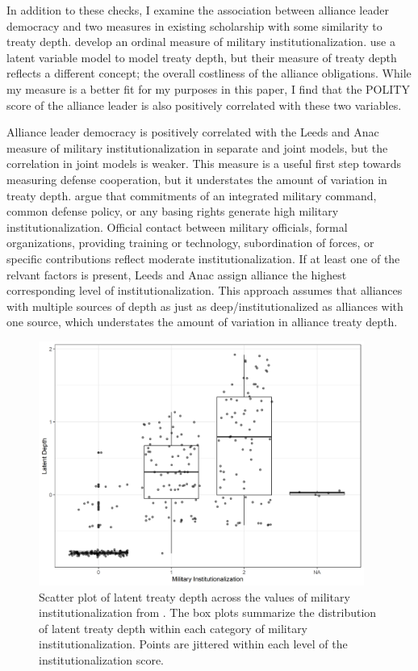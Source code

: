 \documentclass[12pt]{article}
\begin{document}
In addition to these checks, I examine the association between alliance leader democracy and two measures in existing scholarship with some similarity to treaty depth. 
\citet{LeedsAnac2005} develop an ordinal measure of military institutionalization.
\citet{BensonClinton2016} use a latent variable model to model treaty depth, but their measure of treaty depth reflects a different concept; the overall costliness of the alliance obligations. 
While my measure is a better fit for my purposes in this paper, I find that the POLITY score of the alliance leader is also positively correlated with these two variables. 


Alliance leader democracy is positively correlated with the Leeds and Anac measure of military institutionalization in separate and joint models, but the correlation in joint models is weaker.
This measure is a useful first step towards measuring defense cooperation, but it understates the amount of variation in treaty depth. 
\citet{LeedsAnac2005} argue that commitments of an integrated military command, common defense policy, or any basing rights generate high military institutionalization. 
Official contact between military officials, formal organizations, providing training or technology, subordination of forces, or specific contributions reflect moderate institutionalization. 
If at least one of the relvant factors is present, Leeds and Anac assign alliance the highest corresponding level of institutionalization. 
This approach assumes that alliances with multiple sources of depth as just as deep/institutionalized as alliances with one source, which understates the amount of variation in alliance treaty depth.


\begin{figure}[htbp]
	\centering
		\includegraphics[width=0.95\textwidth]{milinst-comp.png}
	\caption{Scatter plot of latent treaty depth across the values of military institutionalization from \citet{LeedsAnac2005}. The box plots summarize the distribution of latent treaty depth within each category of military institutionalization. Points are jittered within each level of the institutionalization score.}
	\label{fig:milinst-comp}
\end{figure} 
\end{document}
